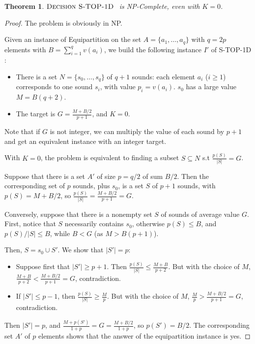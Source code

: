 \documentclass[a4paper]{book}
\newtheorem{theorem}{Theorem}[chapter]
\newtheorem{proof}{\noindent{\bf Proof.} }
\newcommand{\statoned}{{\sc S-TOP-1D }}
\begin{document}
\begin{theorem}
$\text{\sc{Decision} \statoned}$ is {\sc NP}-Complete, even with $K=0$.
\end{theorem}\label{theo:nphard}

\begin{proof}
The problem is obviously in NP. 

Given an instance of {\sc Equipartition} on the set $A=\{a_1,\dots,a_q\}$ with $q=2p$ elements with $B=\sum_{i=1}^q v(a_i)$, we build the following instance $I'$ of \statoned:
\begin{itemize}
\item There is a set $N=\{s_0,\dots,s_q\}$ of $q+1$ sounds: each element $a_i$ ($i\geq 1$) corresponds to one sound $s_i$, with value $p_i=v(a_i)$. $s_0$ has a large value
$M=B(q+2)$. 
\item The target is $G= \frac{M+B/2}{p+1}$, and $K=0$. 
\end{itemize}

Note that if $G$ is not integer, we can multiply the value of each sound by $p+1$ and get an equivalent instance with an integer target.

With $K=0$, the problem is equivalent to finding a subset $S \subseteq N$ s.t $ \frac{p(S)}{|S|} = G$. 

Suppose that there is a set $A'$ of size $p=q/2$ of sum $B/2$. Then the corresponding set of $p$ sounds, plus $s_0$, is a set $S$ of $p+1$ sounds, with $p(S)=M+B/2$, so  $\frac{p(S)}{|S|}=\frac{M+B/2}{p+1}=G$.

Conversely, suppose that there is a nonempty  set $S$ of sounds of average value $G$. First, notice that $S$ necessarily contains $s_0$, otherwise  $p(S)\leq B$, and $p(S)/|S|\leq B$, while $B<G$ (as $M>B(p+1)$).

Then, $S=s_0\cup S'$. We show that $|S'|=p$:
\begin{itemize}
    \item Suppose first that $|S'|\geq p+1$. Then $\frac{p(S)}{|S|}\leq \frac{M+B}{p+2}$. But with the choice of $M$, $\frac{M+B}{p+2}<\frac{M+B/2}{p+1}=G$, contradiction.
    \item If $|S'|\leq p-1$, then $\frac{p(S)}{|S|}\geq \frac{M}{p}$. But with the choice of $M$, $\frac{M}{p}>\frac{M+B/2}{p+1}=G$, contradiction.
\end{itemize}
Then $|S'|=p$, and $\frac{M+p(S')}{1+p}=G=\frac{M+B/2}{1+p}$, so $p(S')=B/2$. The corresponding set $A'$ of $p$ elements shows that the answer of the equipartition instance is yes.
\end{proof}
\end{document}
